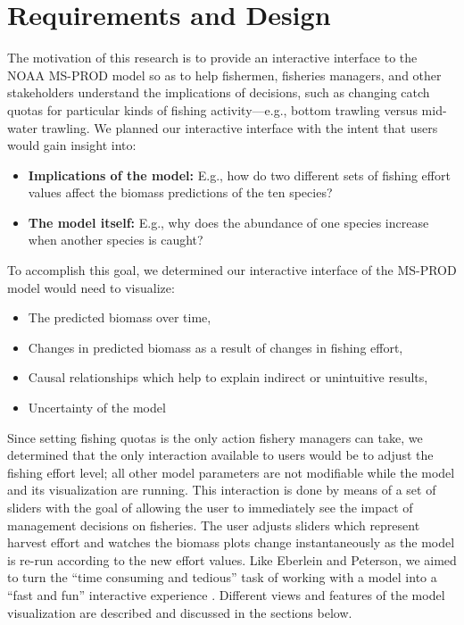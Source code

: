 \chapter{Requirements and Design}


The motivation of this research is to provide an interactive interface to the NOAA MS-PROD model so as to help fishermen, fisheries managers, and other stakeholders understand the implications of decisions, such as changing catch quotas for particular kinds of fishing activity---e.g., bottom trawling versus mid-water trawling.  We planned our interactive interface with the intent that users would gain insight into:

\begin{itemize}
	\item \textbf{Implications of the model:}  E.g., how do two different sets of fishing effort values affect the biomass predictions of the ten species?
	\item \textbf{The model itself:}  E.g., why does the abundance of one species increase when another species is caught? 
\end{itemize} 

To accomplish this goal, we determined our interactive interface of the MS-PROD model would need to visualize:

\begin{itemize}
	\item The predicted biomass over time,
	\item Changes in predicted biomass as a result of changes in fishing effort,
	\item Causal relationships which help to explain indirect or unintuitive results,
	\item Uncertainty of the model
\end{itemize} 

Since setting fishing quotas is the only action fishery managers can take, we determined that the only interaction available to users would be to adjust the fishing effort level; all other model parameters are not modifiable while the model and its visualization are running.  This interaction is done by means of a set of sliders with the goal of allowing the user to immediately see the impact of management decisions on fisheries.  The user adjusts sliders which represent harvest effort and watches the biomass plots change instantaneously as the model is re-run according to the new effort values.  Like Eberlein and Peterson, we aimed to turn the ``time consuming and tedious'' task of working with a model into a ``fast and fun'' interactive experience \cite{eberlein1992}.  Different views and features of the model visualization are described and discussed in the sections below.  

